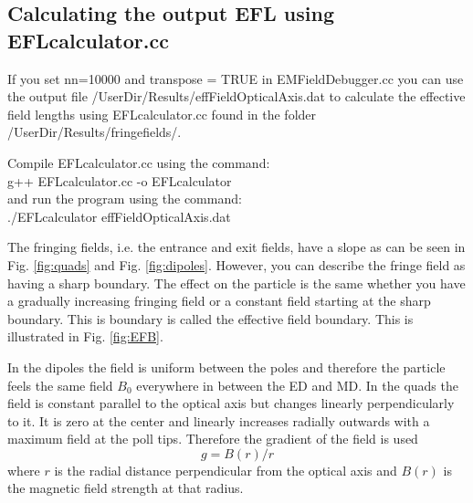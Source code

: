\documentclass[letter,11pt]{article}
\newcommand{\filefont}[1]{{\scriptsize\ttfamily\selectfont #1}\xspace}
\begin{document}
\subsection{Calculating the output EFL using EFLcalculator.cc}\label{sec:eflcalc}

If you set \filefont{nn=10000} and \filefont{transpose = TRUE} in EMFieldDebugger.cc you can use the output file /UserDir/Results/effFieldOpticalAxis.dat to calculate the effective field lengths using EFLcalculator.cc found in the folder /UserDir/Results/fringefields/.

Compile EFLcalculator.cc using the command:\\
\filefont{g++ EFLcalculator.cc -o EFLcalculator}\\
and run the program using the command:\\
\filefont{./EFLcalculator effFieldOpticalAxis.dat}

The fringing fields, i.e. the entrance and exit fields, have a slope as can be seen in Fig. \ref{fig:quads} and Fig. \ref{fig:dipoles}. However, you can describe the fringe field as having a sharp boundary. The effect on the particle is the same whether you have a gradually increasing fringing field or a constant field starting at the sharp boundary. This is boundary is called the effective field boundary. This is illustrated in Fig. \ref{fig:EFB}.

In the dipoles the field is uniform between the poles and therefore the particle feels the same field $B_{0}$ everywhere in between the ED and MD. In the quads the field is constant parallel to the optical axis but changes linearly perpendicularly to it. It is zero at the center and linearly increases radially outwards with a maximum field at the poll tips. Therefore the gradient of the field is used 
\begin{equation}
g=B(r)/r
\end{equation}
where $r$ is the radial distance perpendicular from the optical axis and $B(r)$ is the magnetic field strength at that radius.
\end{document}

